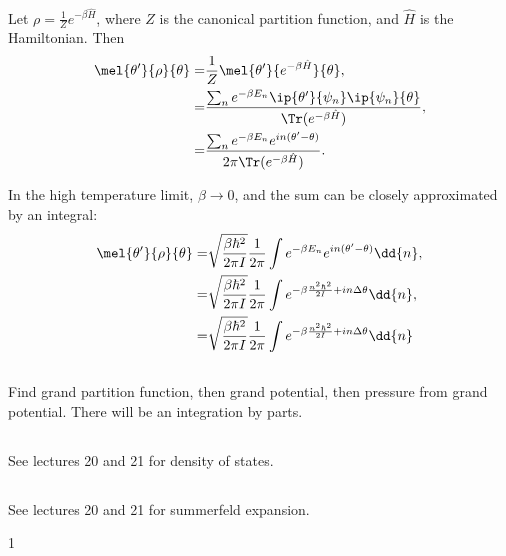 \documentclass[a4paper,12pt,twoside]{article}
\newcommand{\mcols}{0}
\begin{document}
\begin{multicols*}{2}
\subsubsection{}
Let $\rho = \frac{1}{Z} e^{-\beta\hat{H}}$, where $Z$ is the canonical partition function, and $\hat{H}$ is the Hamiltonian.
Then
\begin{align}
	\mel{\theta'}{\rho}{\theta} =& \frac{1}{Z} \mel{\theta'}{e^{-\beta\hat{H}}}{\theta},\\
	=& \frac{\sum_n e^{-\beta E_n}\ip{\theta'}{\psi_n}\ip{\psi_n}{\theta}}{\Tr( e^{-\beta \hat{H}})},\\
	=& \frac{\sum_n e^{-\beta E_n}e^{i n(\theta'-\theta)}}{2\pi\Tr(e^{-\beta \hat{H}})}.
\end{align}

In the high temperature limit, $\beta \rightarrow 0$, and the sum can be closely approximated by an integral:
\begin{align}
	\mel{\theta'}{\rho}{\theta}
	=& \sqrt{\frac{\beta\hbar^2}{2\pi I}}\frac{1}{2\pi} \int e^{-\beta E_n}e^{i n(\theta'-\theta)}\dd{n},\\
	=& \sqrt{\frac{\beta\hbar^2}{2\pi I}}\frac{1}{2\pi} \int e^{-\beta \frac{n^2\hbar^2}{2I}+in\Delta\theta}\dd{n},\\
	=& \sqrt{\frac{\beta\hbar^2}{2\pi I}}\frac{1}{2\pi} \int e^{-\beta \frac{n^2\hbar^2}{2I}+in\Delta\theta}\dd{n}
\end{align}

\subsection{}
\subsubsection{}
\subsubsection{}
\subsubsection{}
\subsection{}
Find grand partition function, then grand potential, then pressure from grand potential.
There will be an integration by parts.
\subsection{}
See lectures 20 and 21 for density of states.
\subsection{}
See lectures 20 and 21 for summerfeld expansion.

\printBib


\if\mcols1
\end{multicols*}
\fi
\end{document}
